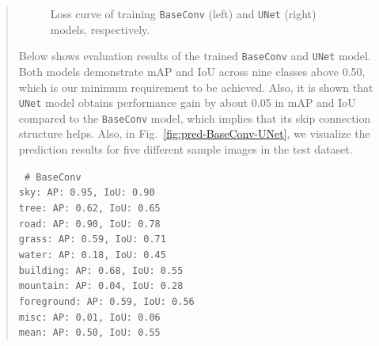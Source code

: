 \documentclass[9pt]{article}
\begin{document}
\begin{quote}
\begin{figure}[h]
    \centering
    \qquad
    \caption{Loss curve of training \texttt{BaseConv} (left) and \texttt{UNet} (right) models, respectively.}
    \label{fig:loss-BaseConv-UNet}
\end{figure}

Below shows evaluation results of the trained \texttt{BaseConv} and \texttt{UNet} model. Both models demonstrate mAP and IoU across nine classes above 0.50, which is our minimum requirement to be achieved. Also, it is shown that \texttt{UNet} model obtains performance gain by about 0.05 in mAP and IoU compared to the \texttt{BaseConv} model, which implies that its skip connection structure helps. Also, in Fig.~\ref{fig:pred-BaseConv-UNet}, we visualize the prediction results for five different sample images in the test dataset.

{\centering \tt \small
\# BaseConv \\
sky: AP: 0.95, IoU: 0.90 \\
tree: AP: 0.62, IoU: 0.65 \\
road: AP: 0.90, IoU: 0.78 \\
grass: AP: 0.59, IoU: 0.71 \\
water: AP: 0.18, IoU: 0.45 \\
building: AP: 0.68, IoU: 0.55 \\
mountain: AP: 0.04, IoU: 0.28 \\
foreground: AP: 0.59, IoU: 0.56 \\
misc: AP: 0.01, IoU: 0.06 \\
mean: AP: 0.50, IoU: 0.55 \\

}
\end{quote}
\end{document}
